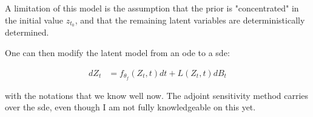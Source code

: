 A limitation of this model is the assumption that the prior is "concentrated" in the initial value $z_{t_0}$, and that the 
remaining latent variables are deterministically determined.

One can then modify the latent model from an \gls{ode} to a \gls{sde}:

\begin{align}
    dZ_t &= f_{\theta_f}(Z_t, t)dt + L(Z_t,t)dB_t
\end{align}

with the notations that we know well now. The adjoint sensitivity method carries over the \gls{sde}, even though I am not 
fully knowledgeable on this yet.